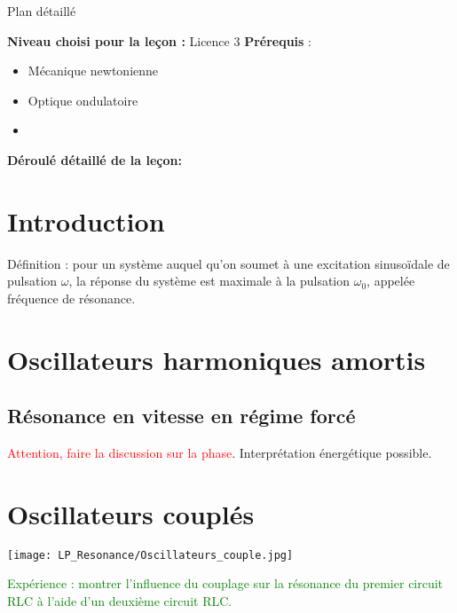 \begin{reportBlock}{Plan détaillé}

  \textbf{Niveau choisi pour la leçon :} Licence 3
  \newline
  \textbf{Prérequis} : \begin{itemize}
      \item Mécanique newtonienne
      \item Optique ondulatoire
      \item 
  \end{itemize}

  \textbf{Déroulé détaillé de la leçon: }  
  
  \section*{Introduction}
Définition : pour un système auquel qu'on soumet à une excitation sinusoïdale de pulsation $\omega$, la réponse du système est maximale à la pulsation $\omega_0$, appelée fréquence de résonance.
  \section{Oscillateurs harmoniques amortis}
  \subsection{Résonance en vitesse en régime forcé} 
\textcolor{red}{Attention, faire la discussion sur la phase}. Interprétation énergétique possible.
  \section{Oscillateurs couplés}
\begin{center}
    \texttt{[image: LP\_Resonance/Oscillateurs\_couple.jpg]}
\end{center}    


\textcolor{green}{Expérience : montrer l'influence du couplage sur la résonance du premier circuit RLC à l'aide d'un deuxième circuit RLC.}
  \section{}
\end{reportBlock}